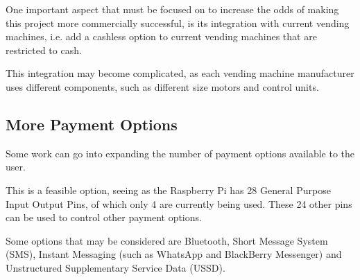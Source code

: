 One important aspect that must be focused on to increase the odds of making this project
more commercially successful, is its integration with current vending machines, i.e. add a
cashless option to current vending machines that are restricted to cash.

This integration may become complicated, as each vending machine manufacturer uses
different components, such as different size motors and control units. 

\subsection{More Payment Options}

Some work can go into expanding the number of payment options available to the user.

This is a feasible option, seeing as the Raspberry Pi has 28 General Purpose Input Output
Pins, of which only 4 are currently being used. These 24 other pins can be used to control
other payment options.

Some options that may be considered are Bluetooth, Short Message System (SMS), Instant
Messaging (such as WhatsApp and BlackBerry Messenger) and Unstructured Supplementary
Service Data (USSD).
